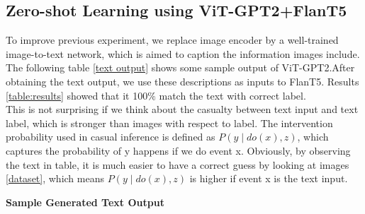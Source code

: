 \documentclass[10pt,twocolumn,letterpaper]{article}
\begin{document}
\subsection{Zero-shot Learning using ViT-GPT2+FlanT5}
To improve previous experiment, we replace image encoder by a well-trained image-to-text network, which is aimed to caption the information images include. The following table \ref{text output} shows some sample output of ViT-GPT2.After obtaining the text output, we use these descriptions as inputs to FlanT5. Results \ref{table:results} showed that it 100$\%$ match the text with correct label.\\
This is not surprising if we think about the casualty between text input and text label, which is stronger than images with respect to label. The intervention probability used in casual inference is defined as $P(y \mid do(x), z)$, which captures the probability of y happens if we do event x. Obviously, by observing the text in table, it is much easier to have a correct guess by looking at images \ref{dataset}, which means $P(y \mid do(x), z)$ is higher if event x is the text input.
\begin{table}[h]
\begin{center}
\textbf{Sample Generated Text Output}
\label{text output}
\end{center}
\end{table}
\end{document}
